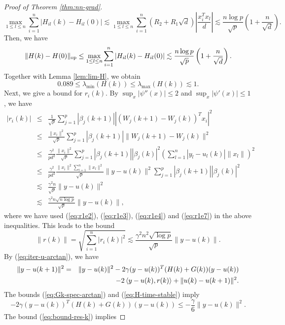 \begin{proof}[Proof of Theorem \ref{thm:nn-grad}]
$$\max_{1\leq l\leq n}\sum_{i=1}^n|H_{il}(k) - H_{il}(0)|\lesssim \max_{1\leq l\leq n}\sum_{i=1}^n(R_2+R_1\sqrt{d})\left|\frac{x_i^Tx_l}{d}\right|\lesssim \frac{n\log p}{\sqrt{p}}\left(1+\frac{n}{\sqrt{d}}\right).$$
Then, we have
$$
\|H(k)-H(0)\|_{\rm op}\leq \max_{1\leq l\leq n}\sum_{i=1}^n|H_{il}(k) - H_{il}(0)|\lesssim \frac{n\log p}{\sqrt{p}}\left(1+\frac{n}{\sqrt{d}}\right).
$$
Together with Lemma \ref{lem:lim-H}, we obtain
\begin{equation}
0.089 \leq \lambda_{\min}(H(k)) \leq \lambda_{\max}(H(k)) \lesssim 1. \label{eq:H-time-stable}
\end{equation}
Next, we give a bound for $r_i(k)$. By $\sup_x|\psi''(x)|\leq 2$ and $\sup_x|\psi'(x)|\leq 1$, we have
\begin{eqnarray*}
|r_i(k)| &\leq& \frac{1}{\sqrt{p}}\sum_{j=1}^p|\beta_j(k+1)||(W_j(k+1)-W_j(k))^Tx_i|^2 \\
&\leq& \frac{\|x_i\|^2}{\sqrt{p}}\sum_{j=1}^p|\beta_j(k+1)|\|W_j(k+1)-W_j(k)\|^2 \\
&\leq& \frac{\gamma^2}{pd^2}\frac{\|x_i\|^2}{\sqrt{p}}\sum_{j=1}^p|\beta_j(k+1)||\beta_j(k)|^2\left(\sum_{l=1}^n|y_l-u_l(k)|\|x_l\|\right)^2 \\
&\leq& \frac{\gamma^2}{pd^2}\frac{\|x_i\|^2\sum_{l=1}^n\|x_l\|^2}{\sqrt{p}}\|y-u(k)\|^2\sum_{j=1}^p|\beta_j(k+1)||\beta_j(k)|^2 \\
&\lesssim& \frac{\gamma^2n}{\sqrt{p}}\|y-u(k)\|^2 \\
&\lesssim& \frac{\gamma^2n\sqrt{n\log p}}{\sqrt{p}}\|y-u(k)\|,
\end{eqnarray*}
where we have used (\ref{eq:r1e2}), (\ref{eq:r1e3}), (\ref{eq:r1e4}) and (\ref{eq:r1e7}) in the above inequalities.
This leads to the bound
\begin{equation}
\|r(k)\|=\sqrt{\sum_{i=1}^n|r_i(k)|^2}\lesssim \frac{\gamma^2n^2\sqrt{\log p}}{\sqrt{p}}\|y-u(k)\|.\label{eq:bound-res-k}
\end{equation}
By (\ref{eq:iter-u-arctan}), we have
\begin{eqnarray*}
\|y-u(k+1)\|^2
&=& \|y-u(k)\|^2 - 2\gamma(y-u(k))^T(H(k)+G(k))(y-u(k)) \\
&& - 2\iprod{y-u(k)}{r(k)} + \|u(k)-u(k+1)\|^2.
\end{eqnarray*}
The bounds (\ref{eq:Gk-spec-arctan}) and (\ref{eq:H-time-stable}) imply
\begin{equation}
- 2\gamma(y-u(k))^T(H(k)+G(k))(y-u(k)) \leq -\frac{\gamma}{6}\|y-u(k)\|^2. \label{eq:main-inner}
\end{equation}
The bound (\ref{eq:bound-res-k}) implies

\end{proof}
